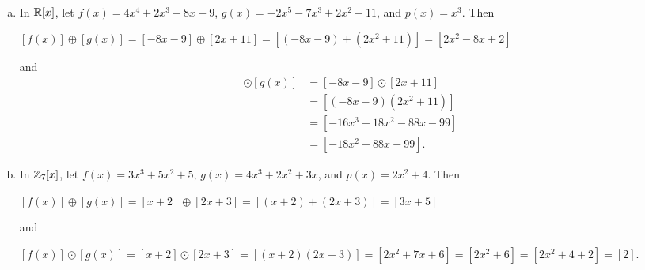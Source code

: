 \documentclass[11pt,fleqn,dvipsnames,usenames]{article}
\begin{document}
\begin{examples}~
\begin{enumerate}[(a)]
\item In $\mathbb{R}[x]$, let $f(x) = 4x^4 + 2x^3 - 8x -9$, $g(x) = -2x^5 - 7x^3 + 2x^2 + 11$, and $p(x) = x^3$.  Then
\begin{center}
$[f(x)]\oplus [g(x)] = [-8x - 9] \oplus [2x + 11] = [(-8x - 9) + (2x^2 + 11)] = [2x^2 - 8x + 2]$
\end{center}
and
\begin{align*}
[f(x)]\odot [g(x)] &= [-8x-9]\odot[2x + 11]\\
&= [(-8x - 9)(2x^2 + 11)]\\
&= [-16x^3 - 18x^2 - 88x - 99]\\
&= [-18x^2 - 88x - 99].
\end{align*}
\vsmsp

\item In $\mathbb{Z}_7[x]$, let $f(x) = 3x^3 + 5x^2 + 5$, $g(x) = 4x^3 + 2x^2 + 3x$, and $p(x) = 2x^2 + 4$.  Then
\begin{center}
$[f(x)]\oplus [g(x)] = [x + 2]\oplus [2x+3] = [(x + 2) + (2x + 3)] = [3x + 5]$
\end{center}
and
\begin{center}
$[f(x)]\odot [g(x)] = [x+2]\odot [2x+3] = [(x+2)(2x +3)] = [2x^2 + 7x + 6] = [2x^2 + 6] = [2x^2 + 4 + 2] = [2]$.
\end{center}
\end{enumerate}
\end{examples}
\smsp
\end{document}
